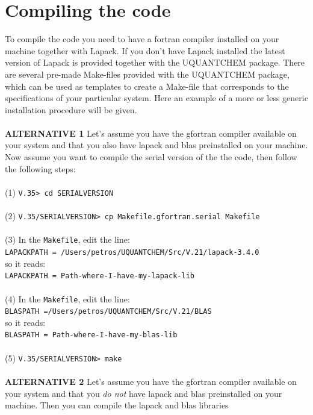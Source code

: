 \documentclass[a4paper,twoside,openany]{book}
\begin{document}
\chapter{Compiling the code}
To compile the code you need to have a fortran compiler installed on your machine together with Lapack. If you don't have Lapack installed the latest 
version of Lapack is provided together with the UQUANTCHEM package. There are several pre-made Make-files provided with the UQUANTCHEM package, which 
can be used as templates to create a Make-file that corresponds to the specifications of your particular system. Here an example of a more or less generic 
installation procedure will be given. 
\\ \\
{\bf ALTERNATIVE 1} Let's assume you have the gfortran compiler available on your system and that you also have lapack and blas preinstalled on your machine. Now assume you want to compile the serial version of the the code,
then follow the following steps: \\  \\
(1) \texttt{V.35> cd SERIALVERSION} \\ \\
(2)  \texttt{V.35/SERIALVERSION> cp Makefile.gfortran.serial Makefile} \\ \\
\noindent
(3) In the \texttt{Makefile},  edit the line:\\ 
\indent
 \texttt{LAPACKPATH = /Users/petros/UQUANTCHEM/Src/V.21/lapack-3.4.0} \\
 \indent
 so it reads: \\
 \indent
 \texttt{LAPACKPATH = Path-where-I-have-my-lapack-lib} \\ \\
\noindent
(4) In the \texttt{Makefile},  edit the line:\\ 
\indent
 \texttt{BLASPATH =/Users/petros/UQUANTCHEM/Src/V.21/BLAS} \\
 \indent
 so it reads: \\
 \indent
 \texttt{BLASPATH = Path-where-I-have-my-blas-lib} \\ \\
\noindent
(5)  \texttt{V.35/SERIALVERSION>  make} \\ \\
\noindent
\noindent
\newpage
\noindent
{\bf ALTERNATIVE 2} Let's assume you have the gfortran compiler available on your system and that you {\it do not} have lapack and blas preinstalled on your machine. Then you can compile the lapack and blas libraries 
\end{document}
